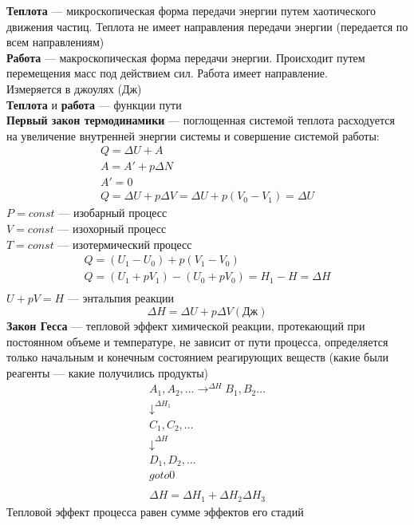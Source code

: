 \documentclass[a4paper, 12pt, oneside]{article}
\begin{document}
{\bfseries Теплота} --- микроскопическая форма передачи энергии путем хаотического движения частиц. Теплота не имеет направления передачи энергии (передается по всем направлениям)\\
{\bfseries Работа} --- макроскопическая форма передачи энергии. Происходит путем перемещения масс под действием сил. Работа имеет направление.\\
Измеряется в джоулях (Дж)\\
{\bfseries Теплота} и {\bfseries работа} --- функции пути\\
\newpage
{\bfseries Первый закон термодинамики} --- поглощенная системой теплота расходуется на увеличение внутренней энергии системы и совершение системой работы:
\begin{gather*}
	Q=\varDelta U+A\\
	A = A'+p\varDelta N\\
	A' = 0\\
	Q = \varDelta U+p\varDelta V = \varDelta U+p(V_0-V_1)=\varDelta U
\end{gather*}
$P = const$ --- изобарный процесс\\
$V = const$ --- изохорный процесс\\
$T = const$ --- изотермический процесс
\begin{gather*}
	Q = (U_1-U_0)+p(V_1-V_0)\\
	Q=(U_1+pV_1)-(U_0+pV_0) = H_1-H=\varDelta H\\
\end{gather*}
$U+pV=H$ --- энтальпия реакции
$$
	\varDelta H = \varDelta U +p\varDelta V (Дж)
$$
{\bfseries Закон Гесса} --- тепловой эффект химической реакции, протекающий при постоянном объеме и температуре, не зависит от пути процесса, определяется только начальным и конечным состоянием реагирующих веществ (какие были реагенты --- какие получились продукты)
\begin{gather*}
	A_1, A_2, \dots \longrightarrow^{\varDelta H} B_1, B_2 \dots\\
	\downarrow^{\varDelta H_1}\\
	C_1, C_2, \dots\\
	\downarrow^{\varDelta H}\\
	D_1, D_2, \dots\\
	goto0\\\\
	\varDelta H = \varDelta H_1 + \varDelta H_2 \varDelta H_3
\end{gather*}
Тепловой эффект процесса равен сумме эффектов его стадий\\\\
\end{document}
